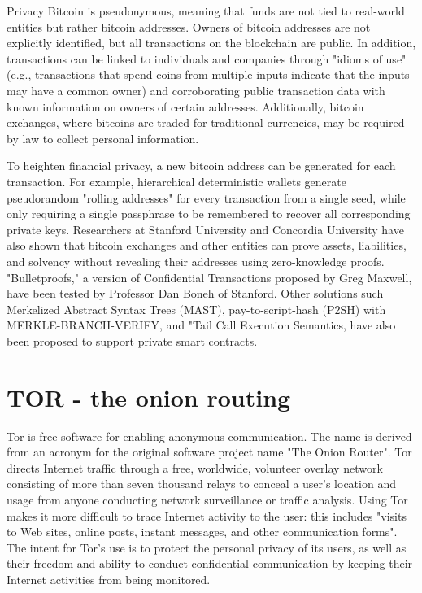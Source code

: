 \documentclass[
  digital, %
  table,   %
  lof,     %
  lot,     %
  oneside
]{fithesis3}
\begin{document}
Privacy
Bitcoin is pseudonymous, meaning that funds are not tied to real-world entities but rather bitcoin addresses. Owners of bitcoin addresses are not explicitly identified, but all transactions on the blockchain are public. 
In addition, transactions can be linked to individuals and companies through "idioms of use" (e.g., transactions that spend coins from multiple inputs indicate that
the inputs may have a common owner) and corroborating public transaction data with known information on owners of certain addresses. Additionally, bitcoin exchanges, where bitcoins are traded for traditional
currencies, may be required by law to collect personal information.

To heighten financial privacy, a new bitcoin address can be generated for each transaction. For example, hierarchical deterministic wallets generate pseudorandom "rolling addresses"
for every transaction from a single seed, while only requiring a single passphrase to be remembered to recover all corresponding private keys. Researchers at Stanford University
and Concordia University have also shown that bitcoin exchanges and other entities can prove assets, liabilities, and solvency without revealing their addresses using zero-knowledge proofs.
"Bulletproofs," a version of Confidential Transactions proposed by Greg Maxwell, have been tested by Professor Dan Boneh of Stanford. Other solutions such Merkelized Abstract Syntax Trees (MAST),
pay-to-script-hash (P2SH) with MERKLE-BRANCH-VERIFY, and "Tail Call Execution Semantics, have also been proposed to support private smart contracts.


\section{TOR - the onion routing}
Tor is free software for enabling anonymous communication. The name is derived from an acronym for the original software project name "The Onion Router". 
Tor directs Internet traffic through a free, worldwide, volunteer overlay network consisting of more than seven thousand relays to conceal a user's location
and usage from anyone conducting network surveillance or traffic analysis. Using Tor makes it more difficult to trace Internet activity to the user: this includes 
"visits to Web sites, online posts, instant messages, and other communication forms". The intent for Tor's use is to protect the personal privacy of its users,
as well as their freedom and ability to conduct confidential communication by keeping their Internet activities from being monitored.
\end{document}
